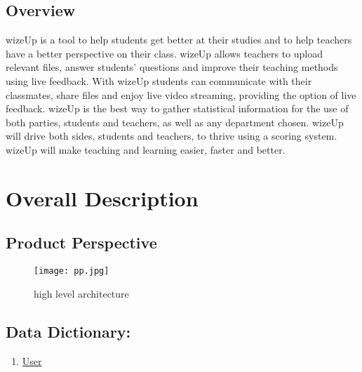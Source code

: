 \documentclass[12pt,a4paper]{article}
\begin{document}
    \subsection{Overview}
    wizeUp is a tool to help students get better at their studies and to
    help teachers have a better perspective on their class. wizeUp
    allows teachers to upload relevant files, answer students' questions and
    improve their teaching methods using live feedback. With
    wizeUp students can communicate with their classmates, share files
    and enjoy live video streaming, providing the option of live feedback.
    \newline
    wizeUp is the best way to gather statistical information for the use
    of both parties, students and teachers, as well as any department
    chosen. wizeUp will drive both sides, students and teachers, to
    thrive using a scoring system. wizeUp will make teaching and
    learning easier, faster and better.

    \newpage

    \section{Overall Description}

    \subsection{Product Perspective}

    \begin{figure}[h!]
        \texttt{[image: pp.jpg]}
        \caption{high level architecture}
        \label{fig: figure}
    \end{figure}

    \newpage


    \subsection{Data Dictionary:}


    \begin{enumerate}
        \item \underline{User}
        \setcounter{numberedCntBA}{\theenumi}
    \end{enumerate}
\end{document}
